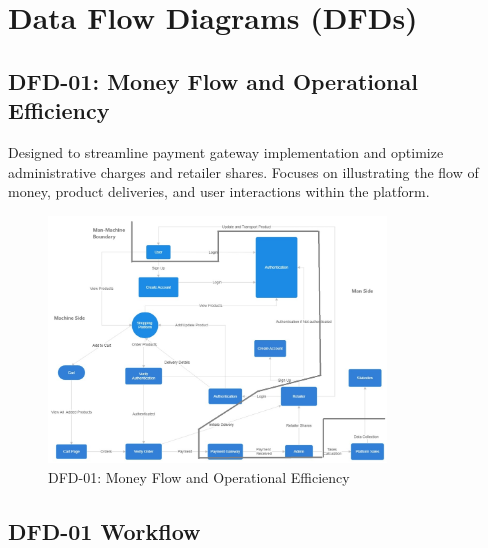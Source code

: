 \documentclass[a4paper,12pt]{article}
\begin{document}
\section{Data Flow Diagrams (DFDs)}

\subsection{DFD-01: Money Flow and Operational Efficiency}
Designed to streamline payment gateway implementation and optimize administrative charges and retailer shares. Focuses on illustrating the flow of money, product deliveries, and user interactions within the platform.

\begin{figure}[H]
    \centering
    \includegraphics[width=0.8\textwidth]{dfd1.jpg}
    \caption{DFD-01: Money Flow and Operational Efficiency}
\end{figure}

\subsection{DFD-01 Workflow}
\end{document}
